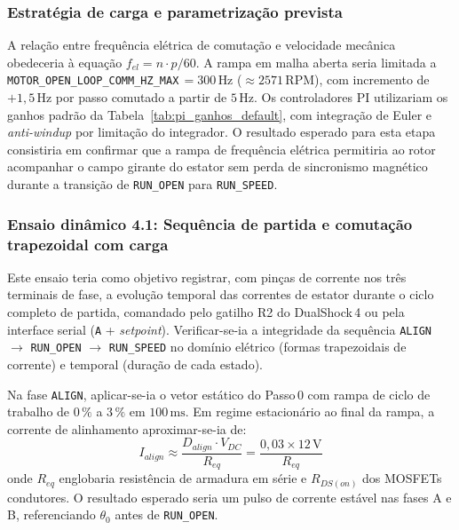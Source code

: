 \subsubsection{Estratégia de carga e parametrização prevista}

A relação entre frequência elétrica de comutação e velocidade mecânica obedeceria à equação $f_{el} = n \cdot p / 60$. A rampa em malha aberta seria limitada a \texttt{MOTOR\_OPEN\_LOOP\_COMM\_HZ\_MAX}\,$= 300\,\text{Hz}$ ($\approx 2571\,\text{RPM}$), com incremento de $+1{,}5\,\text{Hz}$ por passo comutado a partir de $5\,\text{Hz}$. Os controladores PI utilizariam os ganhos padrão da Tabela~\ref{tab:pi_ganhos_default}, com integração de Euler e \textit{anti-windup} por limitação do integrador. O resultado esperado para esta etapa consistiria em confirmar que a rampa de frequência elétrica permitiria ao rotor acompanhar o campo girante do estator sem perda de sincronismo magnético durante a transição de \texttt{RUN\_OPEN} para \texttt{RUN\_SPEED}.

\subsubsection{Ensaio dinâmico 4.1: Sequência de partida e comutação trapezoidal com carga}

Este ensaio teria como objetivo registrar, com pinças de corrente nos três terminais de fase, a evolução temporal das correntes de estator durante o ciclo completo de partida, comandado pelo gatilho R2 do DualShock\,4 ou pela interface serial (\texttt{A} + \textit{setpoint}). Verificar-se-ia a integridade da sequência \texttt{ALIGN} $\to$ \texttt{RUN\_OPEN} $\to$ \texttt{RUN\_SPEED} no domínio elétrico (formas trapezoidais de corrente) e temporal (duração de cada estado).

Na fase \texttt{ALIGN}, aplicar-se-ia o vetor estático do Passo\,0 com rampa de ciclo de trabalho de $0\,\%$ a $3\,\%$ em $100\,\text{ms}$. Em regime estacionário ao final da rampa, a corrente de alinhamento aproximar-se-ia de:
\begin{equation}
    I_{align} \approx \frac{D_{align} \cdot V_{DC}}{R_{eq}} = \frac{0{,}03 \times 12\,\text{V}}{R_{eq}}
    \label{eq:corrente_align_proto}
\end{equation}
\noindent onde $R_{eq}$ englobaria resistência de armadura em série e $R_{DS(on)}$ dos MOSFETs condutores. O resultado esperado seria um pulso de corrente estável nas fases A e B, referenciando $\theta_0$ antes de \texttt{RUN\_OPEN}.

